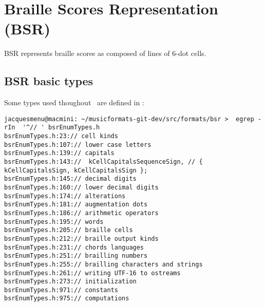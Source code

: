 



\chapter{Braille Scores Representation (BSR)}

BSR represents braille scores as composed of lines of 6-dot cells.


\section{BSR basic types}\label{BSR basic types}

Some types used thoughout \bsrRepr\ are defined in :%
\begin{lstlisting}[language=Terminal]
jacquesmenu@macmini: ~/musicformats-git-dev/src/formats/bsr >  egrep -rIn  '^// ' bsrEnumTypes.h
bsrEnumTypes.h:23:// cell kinds
bsrEnumTypes.h:107:// lower case letters
bsrEnumTypes.h:139:// capitals
bsrEnumTypes.h:143://  kCellCapitalsSequenceSign, // { kCellCapitalsSign, kCellCapitalsSign };
bsrEnumTypes.h:145:// decimal digits
bsrEnumTypes.h:160:// lower decimal digits
bsrEnumTypes.h:174:// alterations
bsrEnumTypes.h:181:// augmentation dots
bsrEnumTypes.h:186:// arithmetic operators
bsrEnumTypes.h:195:// words
bsrEnumTypes.h:205:// braille cells
bsrEnumTypes.h:212:// braille output kinds
bsrEnumTypes.h:231:// chords languages
bsrEnumTypes.h:251:// brailling numbers
bsrEnumTypes.h:255:// brailling characters and strings
bsrEnumTypes.h:261:// writing UTF-16 to ostreams
bsrEnumTypes.h:273:// initialization
bsrEnumTypes.h:971:// constants
bsrEnumTypes.h:975:// computations
\end{lstlisting}


